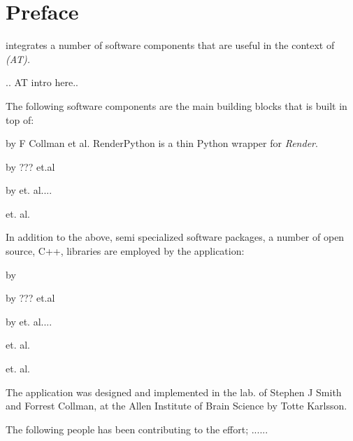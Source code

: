 
\doublespacing

\usechapterimagefalse %
\chapter*{Preface}
\ate integrates a number of software components that are useful in the context of \emph{\at  (AT). }


.. AT intro here..

The following software components are the main building blocks that \ate is built in top of:

\begin{description}[font=$\bullet$~\normalfont\scshape\color{red!50!black}]
\item [Render Python] by F Collman et al. RenderPython is a thin Python wrapper for \emph{Render}.
\item [Render] by ??? et.al 
\item [Fiji] by et. al....
\item [Docker] et. al.
\end{description}

In addition to the above, semi specialized software packages, a number of open source, C++, libraries are employed by the \ate application:

\begin{description}[font=$\bullet$~\normalfont\scshape\color{red!50!black}]
\item [VTK] by 
\item [Poco] by ??? et.al 
\item [libCURL] by et. al....
\item [TinyXML2] et. al.
\item [Dune Scientific Library (dsl) ] et. al.
\end{description}

The \ate application was designed and implemented in the lab. of  Stephen J Smith and Forrest Collman, at the Allen Institute of Brain Science by Totte Karlsson.

The following people has been contributing to the effort; ......


\cleardoublepage
